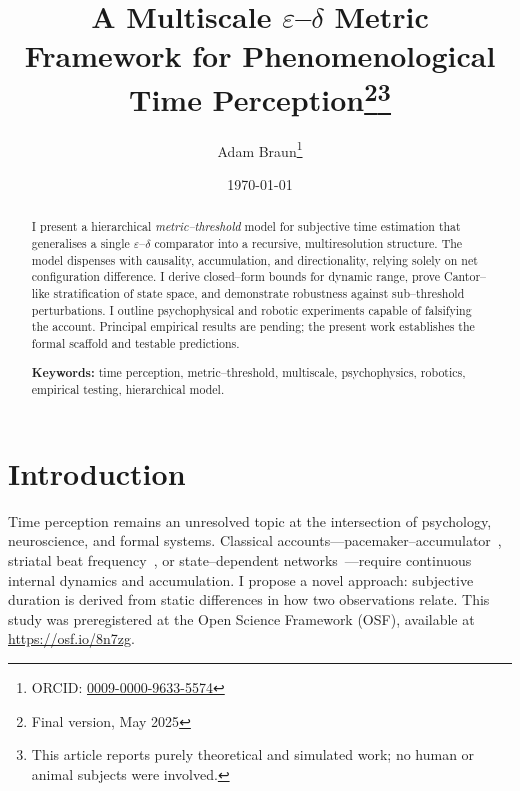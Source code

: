 \documentclass[11pt]{article}
\title{A Multiscale \texorpdfstring{$\varepsilon$--$\delta$}{epsilon--delta} Metric Framework for Phenomenological Time Perception\thanks{Final version, May 2025}\thanks{This article reports purely theoretical and simulated work; no human or animal subjects were involved.}}
\author{Adam Braun\thanks{ORCID: \href{https://orcid.org/0009-0000-9633-5574}{0009-0000-9633-5574}}}
\date{\today}
\begin{document}
\maketitle

\begin{abstract}
I present a hierarchical \emph{metric--threshold} model for subjective
time estimation that generalises a single $\varepsilon$--$\delta$
comparator into a recursive, multiresolution structure.  The model
dispenses with causality, accumulation, and directionality, relying
solely on net configuration difference.  I derive closed--form bounds
for dynamic range, prove Cantor--like stratification of state space,
and demonstrate robustness against sub--threshold perturbations.
I outline psychophysical and robotic experiments capable of falsifying
the account.  Principal empirical results are pending; the present work
establishes the formal scaffold and testable predictions.

\textbf{Keywords:} time perception, metric--threshold, multiscale,
psychophysics, robotics, empirical testing, hierarchical model.
\end{abstract}

\section{Introduction}
Time perception remains an unresolved topic at the intersection of
psychology, neuroscience, and formal systems.  Classical
accounts---pacemaker--accumulator~\citep{gibbonscalar},
striatal beat frequency~\citep{miallbeat}, or state--dependent
networks~\citep{buonomano2009}---require continuous internal dynamics
and accumulation.  I propose a novel approach: subjective duration is
derived from static differences in how two observations relate.
This study was preregistered at the Open Science Framework (OSF), available at \url{https://osf.io/8n7zg}.
\end{document}
